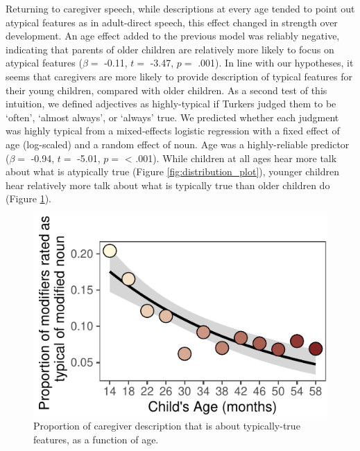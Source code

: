 \documentclass[10pt, letterpaper]{article}
\newenvironment{CodeChunk}{}{}
\begin{document}
Returning to caregiver speech, while descriptions at every age tended to
point out atypical features as in adult-direct speech, this effect
changed in strength over development. An age effect added to the
previous model was reliably negative, indicating that parents of older
children are relatively more likely to focus on atypical features
(\(\beta =\) -0.11, \(t =\) -3.47, \(p =\) .001). In line with our
hypotheses, it seems that caregivers are more likely to provide
description of typical features for their young children, compared with
older children. As a second test of this intuition, we defined
adjectives as highly-typical if Turkers judged them to be `often',
`almost always', or `always' true. We predicted whether each judgment
was highly typical from a mixed-effects logistic regression with a fixed
effect of age (log-scaled) and a random effect of noun. Age was a
highly-reliable predictor (\(\beta =\) -0.94, \(t =\) -5.01, \(p =\)
\textless{} .001). While children at all ages hear more talk about what
is atypically true (Figure \ref{fig:distribution_plot}), younger
children hear relatively more talk about what is typically true than
older children do (Figure \ref{fig:prototypical_plot}).

\begin{CodeChunk}
\begin{figure}[tb]

{\centering \includegraphics{figs/prototypical_plot-1} 

}

\caption[Proportion of caregiver description that is about typically-true features, as a function of age]{Proportion of caregiver description that is about typically-true features, as a function of age.}\label{fig:prototypical_plot}
\end{figure}
\end{CodeChunk}
\end{document}
